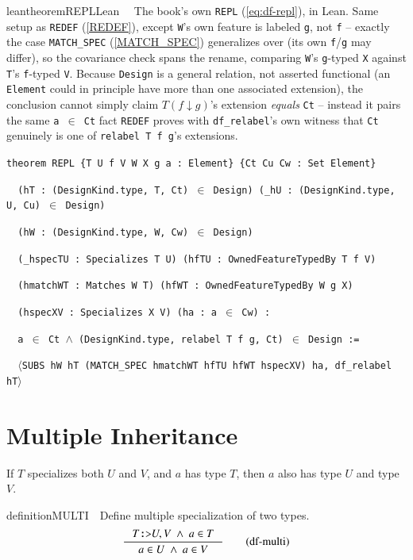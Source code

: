 \begin{restatable}{leantheorem}{REPLLean}~~ The book's own \texttt{REPL}
(\ref{eq:df-repl}), in Lean. Same setup as \texttt{REDEF} (\ref{REDEF}), except \texttt{W}'s own
feature is labeled \texttt{g}, not \texttt{f} -- exactly the case \texttt{MATCH\_SPEC}
(\ref{MATCH_SPEC}) generalizes over (its own \texttt{f}/\texttt{g} may differ), so the
covariance check spans the rename, comparing \texttt{W}'s \texttt{g}-typed \texttt{X} against
\texttt{T}'s \texttt{f}-typed \texttt{V}. Because \texttt{Design} is a general relation, not
asserted functional (an \texttt{Element} could in principle have more than one associated
extension), the conclusion cannot simply claim $T(f \downarrow g)$'s extension \emph{equals}
\texttt{Ct} -- instead it pairs the same \texttt{a $\in$ Ct} fact \texttt{REDEF} proves with
\texttt{df\_relabel}'s own witness that \texttt{Ct} genuinely is one of \texttt{relabel T f g}'s
extensions.

\texttt{\textcolor{leancolor}{theorem} \textcolor{leanyellow}{REPL} \{T U f V W X g a : Element\} \{Ct Cu Cw : Set Element\}}

\texttt{~~(hT : (DesignKind.type, T, Ct) $\in$ Design) (\_hU : (DesignKind.type, U, Cu) $\in$ Design)}

\texttt{~~(hW : (DesignKind.type, W, Cw) $\in$ Design)}

\texttt{~~(\_hspecTU : Specializes T U) (hfTU : OwnedFeatureTypedBy T f V)}

\texttt{~~(hmatchWT : Matches W T) (hfWT : OwnedFeatureTypedBy W g X)}

\texttt{~~(hspecXV : Specializes X V) (ha : a $\in$ Cw) :}

\texttt{~~a $\in$ Ct $\wedge$ (DesignKind.type, relabel T f g, Ct) $\in$ Design :=}

\texttt{~~$\langle$SUBS hW hT (MATCH\_SPEC hmatchWT hfTU hfWT hspecXV) ha, df\_relabel hT$\rangle$}
\label{REPL}
\end{restatable}

\section{Multiple Inheritance}
If $T$ specializes both $U$ and $V$, and $a$ has type $T$, then $a$ also has type $U$ and type $V$.
\begin{restatable}{definition}{MULTI}~~Define multiple specialization of two types.   
\begin{align}
\inference
{T\texttt{:>}U,V ~\wedge~a \in T}
{a \in U~\wedge~a \in V}
\label{eq:df-multi}\tag{df-multi}
\end{align}
\end{restatable}


